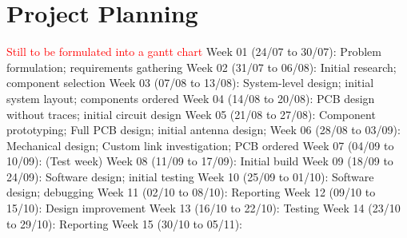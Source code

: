 
\chapter{Project Planning}
\textcolor{red}{Still to be formulated into a gantt chart}
Week 01 (24/07 to 30/07): Problem formulation; requirements gathering
Week 02 (31/07 to 06/08): Initial research; component selection
Week 03 (07/08 to 13/08): System-level design; initial system layout; components ordered
Week 04 (14/08 to 20/08): PCB design without traces; initial circuit design
Week 05 (21/08 to 27/08): Component prototyping; Full PCB design; initial antenna design;
Week 06 (28/08 to 03/09): Mechanical design; Custom link investigation; PCB ordered
Week 07 (04/09 to 10/09): (Test week)
Week 08 (11/09 to 17/09): Initial build
Week 09 (18/09 to 24/09): Software design; initial testing
Week 10 (25/09 to 01/10): Software design; debugging
Week 11 (02/10 to 08/10): Reporting
Week 12 (09/10 to 15/10): Design improvement
Week 13 (16/10 to 22/10): Testing
Week 14 (23/10 to 29/10): Reporting
Week 15 (30/10 to 05/11):
